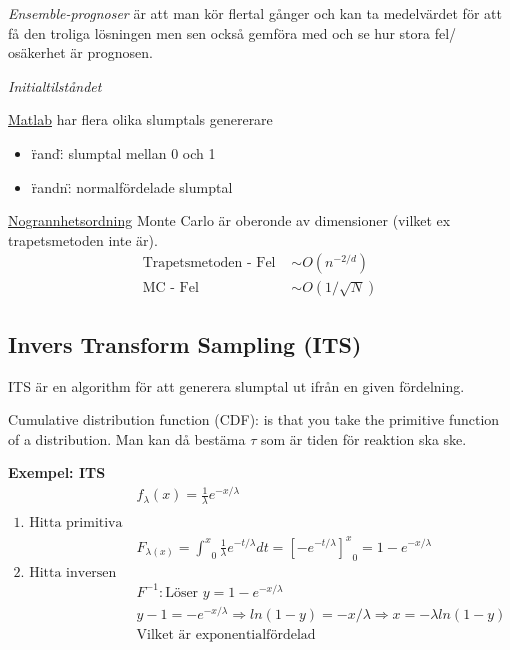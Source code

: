 \documentclass{article}
\begin{document}
\textit{Ensemble-prognoser} är att man kör flertal gånger och kan ta medelvärdet
för att få den troliga lösningen men sen också gemföra med och se hur stora fel/
osäkerhet är prognosen. \newline

\textit{Initialtilståndet} \newline

\underline{Matlab} har flera olika slumptals genererare
\begin{itemize}
  \item \"rand\": slumptal mellan 0 och 1
  \item \"randn\": normalfördelade slumptal
\end{itemize}

\underline{Nogrannhetsordning} Monte Carlo är oberonde av dimensioner 
(vilket ex trapetsmetoden inte är).
\begin{align*}
  \text{Trapetsmetoden - Fel } &\sim O(n^{-2/d})  \\
  \text{MC - Fel } &\sim O(1/\sqrt{N}) 
\end{align*}


\newpage

\subsection{Invers Transform Sampling (ITS)}
ITS är en algorithm för att generera slumptal ut ifrån 
en given fördelning.

Cumulative distribution function (CDF): is that you take the 
primitive function of a distribution. 
Man kan då bestäma $\tau$ som är tiden för reaktion ska ske.

\textbf{Exempel: ITS}
\begin{align*}
  &f_{\lambda}(x)=\frac{1}{\lambda}e^{-x/\lambda} \\
  &\\
  \text{1. Hitta primitiva funktionen }&   \\
  & F_{\lambda(x)} = {\int^x}_0 \frac{1}{\lambda}e^{-t/\lambda}dt 
  = {[-e^{-t/\lambda}]^x}_0
  = 1-e^{-x/\lambda} \\
  \text{2. Hitta inversen }& \\
  & F^{-1}: \text{Löser } y=1-e^{-x/\lambda} \\
  & y-1 = -e^{-x/\lambda} \Rightarrow ln(1-y)=-x/\lambda \Rightarrow x=-\lambda ln(1-y) \\
  &\text{Vilket är exponentialfördelad}
\end{align*}
\end{document}
